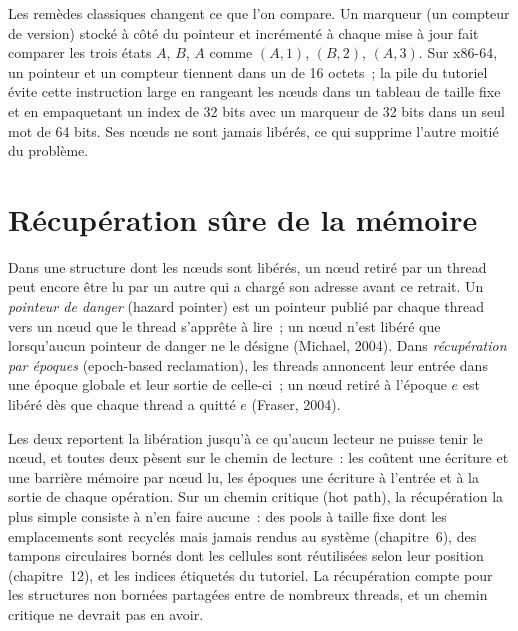 Les remèdes classiques changent ce que l'on compare. Un marqueur (un compteur de version) stocké à côté du pointeur et incrémenté à chaque
mise à jour fait comparer les trois états $A$, $B$, $A$ comme $(A,1)$, $(B,2)$, $(A,3)$. Sur x86-64, un pointeur et un compteur tiennent dans un
 de 16 octets~; la pile du tutoriel évite cette instruction large en rangeant les nœuds dans un tableau de taille fixe et en empaquetant un
index de 32 bits avec un marqueur de 32 bits dans un seul mot de 64 bits. Ses nœuds ne sont jamais libérés, ce qui supprime l'autre moitié du
problème.

\section{Récupération sûre de la mémoire}

\begin{definition}\label{def:ll:lock-free-programming:reclaim}
Dans une structure  dont les nœuds sont libérés, un nœud retiré par un thread peut encore être lu par un autre qui a chargé son
adresse avant ce retrait. Un \emph{pointeur de danger} (hazard pointer) est un pointeur publié par chaque thread vers un nœud que le
thread s'apprête à lire~; un nœud n'est libéré que lorsqu'aucun pointeur de danger ne le désigne (Michael, 2004). Dans
\emph{récupération par époques} (epoch-based reclamation), les threads annoncent leur entrée dans une époque globale et leur sortie de celle-ci~; un nœud
retiré à l'époque $e$ est libéré dès que chaque thread a quitté $e$ (Fraser, 2004).
\end{definition}

Les deux reportent la libération jusqu'à ce qu'aucun lecteur ne puisse tenir le nœud, et toutes deux pèsent sur le chemin de lecture~: les  coûtent une écriture et une
barrière mémoire par nœud lu, les époques une écriture à l'entrée et à la sortie de chaque opération. Sur un chemin critique (hot path), la récupération la plus simple consiste à n'en faire aucune~:
des pools à taille fixe dont les emplacements sont recyclés mais jamais rendus au système (chapitre~6), des tampons circulaires bornés dont les cellules sont réutilisées
selon leur position (chapitre~12), et les indices étiquetés du tutoriel. La récupération compte pour les structures non bornées partagées entre
de nombreux threads, et un chemin critique ne devrait pas en avoir.

